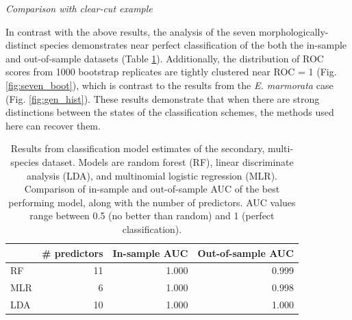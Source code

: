 \documentclass[12pt,letterpaper]{article}
\renewcommand{\subsection}[1]{%
\bigskip
\begin{center}
\begin{large}
\normalfont\itshape #1
\end{large}
\end{center}}
\begin{document}
\subsection{Comparison with clear-cut example}
In contrast with the above results, the analysis of the seven morphologically-distinct species demonstrates near perfect classification of the both the in-sample and out-of-sample datasets (Table \ref{tab:second_res}). Additionally, the distribution of ROC scores from 1000 bootstrap replicates are tightly clustered near ROC = 1 (Fig. \ref{fig:seven_boot}), which is contrast to the results from the \textit{E. marmorata} case (Fig. \ref{fig:gen_hist}). These results demonstrate that when there are strong distinctions between the states of the classification schemes, the methods used here can recover them.

\begin{table}[ht]
  \centering
  \caption{Results from classification model estimates of the secondary, multi-species dataset. Models are random forest (RF), linear discriminate analysis (LDA), and multinomial logistic regression (MLR). Comparison of in-sample and out-of-sample AUC of the best performing model, along with the number of predictors. AUC values range between 0.5 (no better than random) and 1 (perfect classification).}
  \begin{tabular}{ l r r r }
    \hline
    & \# predictors & In-sample AUC & Out-of-sample AUC \\ 
    \hline
    \hline
    RF &   11 & 1.000 & 0.999 \\ 
    MLR &    6 & 1.000 & 0.998 \\ 
    LDA &   10 & 1.000 & 1.000 \\ 
    \hline
  \end{tabular}
  \label{tab:second_res}
\end{table}
\end{document}
